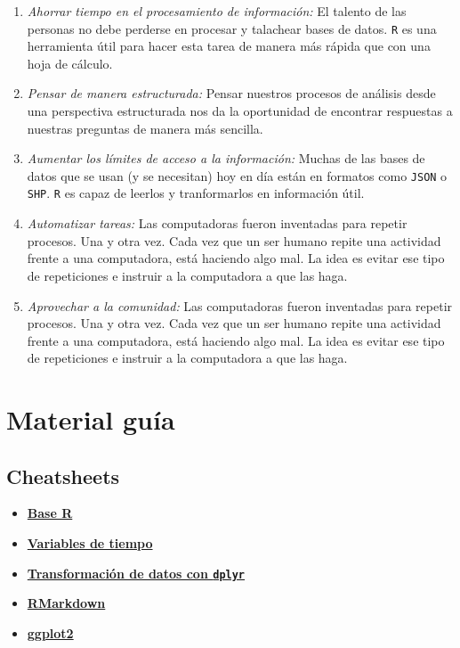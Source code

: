 \documentclass[]{article}
\begin{document}
\begin{enumerate}
\def\labelenumi{\arabic{enumi}.}
\item
  \emph{Ahorrar tiempo en el procesamiento de información:} El talento
  de las personas no debe perderse en procesar y talachear bases de
  datos. \texttt{R} es una herramienta útil para hacer esta tarea de
  manera más rápida que con una hoja de cálculo.
\item
  \emph{Pensar de manera estructurada:} Pensar nuestros procesos de
  análisis desde una perspectiva estructurada nos da la oportunidad de
  encontrar respuestas a nuestras preguntas de manera más sencilla.
\item
  \emph{Aumentar los límites de acceso a la información:} Muchas de las
  bases de datos que se usan (y se necesitan) hoy en día están en
  formatos como \texttt{JSON} o \texttt{SHP}. \texttt{R} es capaz de
  leerlos y tranformarlos en información útil.
\item
  \emph{Automatizar tareas:} Las computadoras fueron inventadas para
  repetir procesos. Una y otra vez. Cada vez que un ser humano repite
  una actividad frente a una computadora, está haciendo algo mal. La
  idea es evitar ese tipo de repeticiones e instruir a la computadora a
  que las haga.
\item
  \emph{Aprovechar a la comunidad:} Las computadoras fueron inventadas
  para repetir procesos. Una y otra vez. Cada vez que un ser humano
  repite una actividad frente a una computadora, está haciendo algo mal.
  La idea es evitar ese tipo de repeticiones e instruir a la computadora
  a que las haga.
\end{enumerate}

\section{Material guía}\label{material-guia}

\subsection{Cheatsheets}\label{cheatsheets}

\begin{itemize}
\item
  \href{https://www.rstudio.com/wp-content/uploads/2016/10/r-cheat-sheet-3.pdf}{\textbf{Base
  R}}
\item
  \href{https://github.com/rstudio/cheatsheets/raw/master/lubridate.pdf}{\textbf{Variables
  de tiempo}}
\item
  \href{https://github.com/rstudio/cheatsheets/raw/master/data-transformation.pdf}{\textbf{Transformación
  de datos con \texttt{dplyr}}}
\item
  \href{https://www.rstudio.com/wp-content/uploads/2015/03/rmarkdown-reference.pdf}{\textbf{RMarkdown}}
\item
  \href{https://github.com/rstudio/cheatsheets/raw/master/data-visualization-2.1.pdf}{\textbf{ggplot2}}
\end{itemize}
\end{document}

